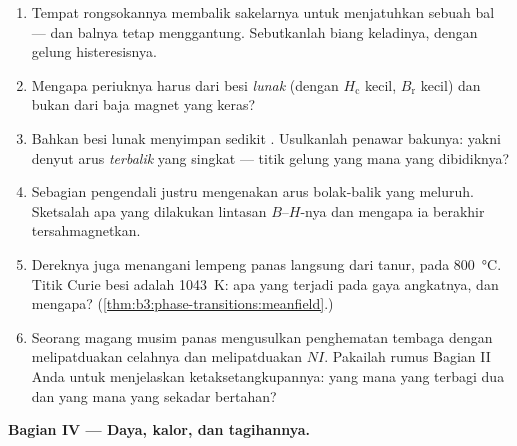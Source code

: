 \begin{problem}
\begin{enumerate}[resume]
  \item Tempat rongsokannya membalik sakelarnya untuk menjatuhkan sebuah
        bal --- dan balnya tetap menggantung. Sebutkanlah biang keladinya,
        dengan gelung histeresisnya.
  \item Mengapa periuknya harus dari besi \emph{lunak} (dengan
        $H_{\text{c}}$ kecil, $B_{\text{r}}$ kecil) dan bukan dari baja
        magnet yang keras?
  \item Bahkan besi lunak menyimpan sedikit . Usulkanlah
        penawar bakunya: yakni denyut arus \emph{terbalik} yang singkat ---
        titik gelung yang mana yang dibidiknya?
  \item Sebagian pengendali justru mengenakan arus bolak-balik yang
        meluruh. Sketsalah apa yang dilakukan lintasan $B$--$H$-nya dan mengapa
        ia berakhir tersahmagnetkan.
  \item Dereknya juga menangani lempeng panas langsung dari tanur,
        pada \qty{800}{\celsius}. Titik Curie besi adalah
        \qty{1043}{K}: apa yang terjadi pada gaya angkatnya, dan mengapa?
        (\cref{thm:b3:phase-transitions:meanfield}.)
  \item Seorang magang musim panas mengusulkan penghematan tembaga dengan
        melipatduakan celahnya dan melipatduakan $NI$. Pakailah rumus Bagian II Anda untuk
        menjelaskan ketaksetangkupannya: yang mana yang terbagi dua dan yang mana
        yang sekadar bertahan?
\end{enumerate}

\medskip\noindent\textbf{Bagian IV --- Daya, kalor, dan tagihannya.}


\end{problem}
